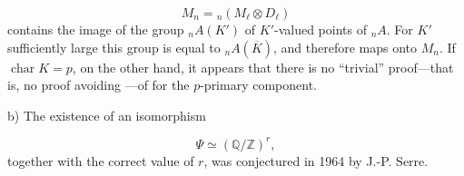 \begin{equation*}
M_n={}_n(M_\ell\otimes D_\ell)
\end{equation*}
contains the image of the group ${}_nA(K')$ of $K'$-valued points of
${}_nA$. For $K'$ sufficiently large this group is equal to
${}_nA(\overline K)$, and therefore maps onto $M_n$. If
$\operatorname{char}K=p$, on the other hand, it appears that there is no
``trivial'' proof---that is, no proof avoiding ---of  for the
$p$-primary component.

b) The existence of an isomorphism

\begin{equation*}
\Psi\simeq(\mathbb Q/\mathbb Z)^r,
\end{equation*}
together with the correct value of $r$, was conjectured in 1964 by
J.-P. Serre.
